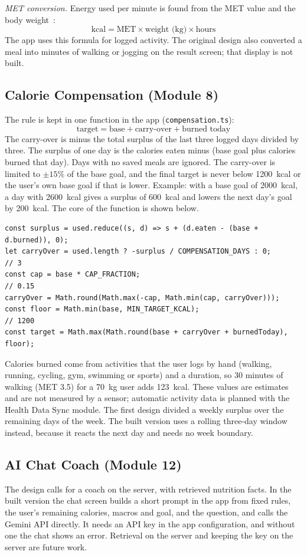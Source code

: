 \textit{MET conversion.} Energy used per minute is found from the MET value and the body weight~\cite{met}:
\[
\text{kcal} = \text{MET} \times \text{weight (kg)} \times \text{hours}
\]
The app uses this formula for logged activity. The original design also converted a meal into minutes of walking
or jogging on the result screen; that display is not built.

\subsection{Calorie Compensation (Module 8)}
The rule is kept in one function in the app (\texttt{compensation.ts}):
\[
\text{target} = \text{base} + \text{carry-over} + \text{burned today}
\]
The carry-over is minus the total surplus of the last three logged days divided by three. The surplus of one day
is the calories eaten minus (base goal plus calories burned that day). Days with no saved meals are ignored. The
carry-over is limited to $\pm 15\%$ of the base goal, and the final target is never below 1200~kcal or the user's
own base goal if that is lower. Example: with a base goal of 2000~kcal, a day with 2600~kcal gives a surplus of
600~kcal and lowers the next day's goal by 200~kcal. The core of the function is shown below.
\begin{verbatim}
const surplus = used.reduce((s, d) => s + (d.eaten - (base + d.burned)), 0);
let carryOver = used.length ? -surplus / COMPENSATION_DAYS : 0;      // 3
const cap = base * CAP_FRACTION;                                     // 0.15
carryOver = Math.round(Math.max(-cap, Math.min(cap, carryOver)));
const floor = Math.min(base, MIN_TARGET_KCAL);                       // 1200
const target = Math.max(Math.round(base + carryOver + burnedToday), floor);
\end{verbatim}
Calories burned come from activities that the user logs by hand (walking, running, cycling, gym, swimming or
sports) and a duration, so 30 minutes of walking (MET 3.5) for a 70~kg user adds 123~kcal. These values are
estimates and are not measured by a sensor; automatic activity data is planned with the Health Data Sync module.
The first design divided a weekly surplus over the remaining days of the week. The built version uses a rolling
three-day window instead, because it reacts the next day and needs no week boundary.

\subsection{AI Chat Coach (Module 12)}\label{sec:coach}
The design calls for a coach on the server, with retrieved nutrition facts. In the built version the chat screen
builds a short prompt in the app from fixed rules, the user's remaining calories, macros and goal, and the
question, and calls the Gemini API directly. It needs an API key in the app configuration, and without one the
chat shows an error. Retrieval on the server and keeping the key on the server are future work.


